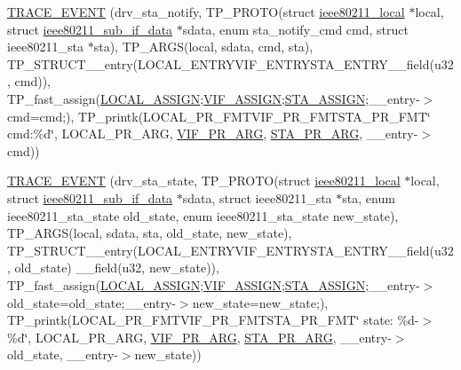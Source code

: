 \begin{DoxyCompactItemize}
\hyperlink{driver-trace_8h_a62a94d0e279adeda22804423e2db7839}{T\-R\-A\-C\-E\-\_\-\-E\-V\-E\-N\-T} (drv\-\_\-sta\-\_\-notify, T\-P\-\_\-\-P\-R\-O\-T\-O(struct \hyperlink{structieee80211__local}{ieee80211\-\_\-local} $\ast$local, struct \hyperlink{structieee80211__sub__if__data}{ieee80211\-\_\-sub\-\_\-if\-\_\-data} $\ast$sdata, enum sta\-\_\-notify\-\_\-cmd cmd, struct ieee80211\-\_\-sta $\ast$sta), T\-P\-\_\-\-A\-R\-G\-S(local, sdata, cmd, sta), T\-P\-\_\-\-S\-T\-R\-U\-C\-T\-\_\-\-\_\-entry(L\-O\-C\-A\-L\-\_\-\-E\-N\-T\-R\-Y\-V\-I\-F\-\_\-\-E\-N\-T\-R\-Y\-S\-T\-A\-\_\-\-E\-N\-T\-R\-Y\-\_\-\-\_\-field(u32, cmd)), T\-P\-\_\-fast\-\_\-assign(\hyperlink{driver-trace_8h_ab19d9141887ea92ef9640df06a51e0a1}{L\-O\-C\-A\-L\-\_\-\-A\-S\-S\-I\-G\-N};\hyperlink{driver-trace_8h_af5ede80f04ffcb3f644f68837b1d252c}{V\-I\-F\-\_\-\-A\-S\-S\-I\-G\-N};\hyperlink{driver-trace_8h_abbd837b5fc444c0cb48b5954f8ad068a}{S\-T\-A\-\_\-\-A\-S\-S\-I\-G\-N};\-\_\-\-\_\-entry-\/$>$cmd=cmd;), T\-P\-\_\-printk(L\-O\-C\-A\-L\-\_\-\-P\-R\-\_\-\-F\-M\-T\-V\-I\-F\-\_\-\-P\-R\-\_\-\-F\-M\-T\-S\-T\-A\-\_\-\-P\-R\-\_\-\-F\-M\-T\char`\"{} cmd\-:\%d\char`\"{}, L\-O\-C\-A\-L\-\_\-\-P\-R\-\_\-\-A\-R\-G, \hyperlink{driver-trace_8h_a12c9f3afcd1c461f7ae2f86fd8503977}{V\-I\-F\-\_\-\-P\-R\-\_\-\-A\-R\-G}, \hyperlink{driver-trace_8h_a3b71cc34bae124028f19970a4220d4ab}{S\-T\-A\-\_\-\-P\-R\-\_\-\-A\-R\-G}, \-\_\-\-\_\-entry-\/$>$cmd))
\item 
\hyperlink{driver-trace_8h_aaaf1a6bc82ebb83e06418afa27819efa}{T\-R\-A\-C\-E\-\_\-\-E\-V\-E\-N\-T} (drv\-\_\-sta\-\_\-state, T\-P\-\_\-\-P\-R\-O\-T\-O(struct \hyperlink{structieee80211__local}{ieee80211\-\_\-local} $\ast$local, struct \hyperlink{structieee80211__sub__if__data}{ieee80211\-\_\-sub\-\_\-if\-\_\-data} $\ast$sdata, struct ieee80211\-\_\-sta $\ast$sta, enum ieee80211\-\_\-sta\-\_\-state old\-\_\-state, enum ieee80211\-\_\-sta\-\_\-state new\-\_\-state), T\-P\-\_\-\-A\-R\-G\-S(local, sdata, sta, old\-\_\-state, new\-\_\-state), T\-P\-\_\-\-S\-T\-R\-U\-C\-T\-\_\-\-\_\-entry(L\-O\-C\-A\-L\-\_\-\-E\-N\-T\-R\-Y\-V\-I\-F\-\_\-\-E\-N\-T\-R\-Y\-S\-T\-A\-\_\-\-E\-N\-T\-R\-Y\-\_\-\-\_\-field(u32, old\-\_\-state) \-\_\-\-\_\-field(u32, new\-\_\-state)), T\-P\-\_\-fast\-\_\-assign(\hyperlink{driver-trace_8h_ab19d9141887ea92ef9640df06a51e0a1}{L\-O\-C\-A\-L\-\_\-\-A\-S\-S\-I\-G\-N};\hyperlink{driver-trace_8h_af5ede80f04ffcb3f644f68837b1d252c}{V\-I\-F\-\_\-\-A\-S\-S\-I\-G\-N};\hyperlink{driver-trace_8h_abbd837b5fc444c0cb48b5954f8ad068a}{S\-T\-A\-\_\-\-A\-S\-S\-I\-G\-N};\-\_\-\-\_\-entry-\/$>$old\-\_\-state=old\-\_\-state;\-\_\-\-\_\-entry-\/$>$new\-\_\-state=new\-\_\-state;), T\-P\-\_\-printk(L\-O\-C\-A\-L\-\_\-\-P\-R\-\_\-\-F\-M\-T\-V\-I\-F\-\_\-\-P\-R\-\_\-\-F\-M\-T\-S\-T\-A\-\_\-\-P\-R\-\_\-\-F\-M\-T\char`\"{} state\-: \%d-\/$>$\%d\char`\"{}, L\-O\-C\-A\-L\-\_\-\-P\-R\-\_\-\-A\-R\-G, \hyperlink{driver-trace_8h_a12c9f3afcd1c461f7ae2f86fd8503977}{V\-I\-F\-\_\-\-P\-R\-\_\-\-A\-R\-G}, \hyperlink{driver-trace_8h_a3b71cc34bae124028f19970a4220d4ab}{S\-T\-A\-\_\-\-P\-R\-\_\-\-A\-R\-G}, \-\_\-\-\_\-entry-\/$>$old\-\_\-state, \-\_\-\-\_\-entry-\/$>$new\-\_\-state))

\end{DoxyCompactItemize}
